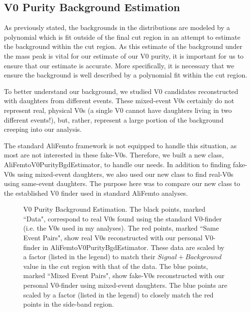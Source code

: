 \documentclass[/home/jesse/Analysis/FemtoAnalysis/AnalysisNotes/AnalysisNoteJBuxton.tex]{subfiles}
\begin{document}
\subsection{V0 Purity Background Estimation}
\label{V0PurBgdEst}

As previously stated, the backgrounds in the \minv distributions are modeled by a polynomial which is fit outside of the final cut region in an attempt to estimate the background within the cut region.  
As this estimate of the background under the mass peak is vital for our estimate of our V0 purity, it is important for us to ensure that our estimate is accurate.  
More specifically, it is necessary that we ensure the background is well described by a polynomial fit within the cut region.

To better understand our background, we studied V0 candidates reconstructed with daughters from different events.  
These mixed-event V0s certainly do not represent real, physical V0s (a single V0 cannot have daughters living in two different events!), but, rather, represent a large portion of the background creeping into our analysis.

The standard AliFemto framework is not equipped to handle this situation, as most are not interested in these fake-V0s.  
Therefore, we built a new class, AliFemtoV0PurityBgdEstimator, to handle our needs.  
In addition to finding fake-V0s using mixed-event daughters, we also used our new class to find real-V0s using same-event daughters.  
The purpose here was to compare our new class to the established V0 finder used in standard AliFemto analyses.


\begin{figure}[h!]
  \centering
  \caption[V0 Purity Background Estimation]
  {
  V0 Purity Background Estimation.  
  The black points, marked ``Data", correspond to real V0s found using the standard V0-finder (i.e. the V0s used in my analyses).  
  The red points, marked ``Same Event Pairs", show real V0s reconstructed with our personal V0-finder in AliFemtoV0PurityBgdEstimator.
  These data are scaled by a factor (listed in the legend) to match their $Signal+Background$ value in the cut region with that of the data.  
  The blue points, marked ``Mixed Event Pairs", show fake-V0s reconstructed with our personal V0-finder using mixed-event daughters.  
  The blue points are scaled by a factor (listed in the legend) to closely match the red points in the side-band region.
  }
  \label{fig:V0PurBgdEst}
\end{figure}
\end{document}
